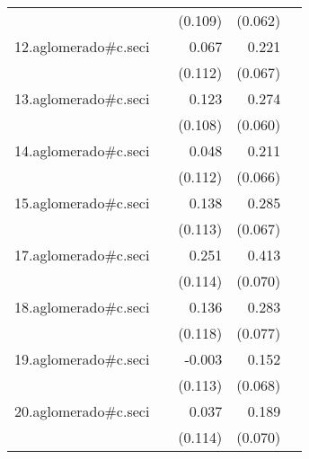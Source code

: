 {\begin{longtable}{l*{4}{D{.}{.}{-1}}}
            &                     &     (0.109)         &     (0.062)         &                     \\
\addlinespace
12.aglomerado#c.seci&                     &       0.067         &       0.221\sym{***}&                     \\
            &                     &     (0.112)         &     (0.067)         &                     \\
\addlinespace
13.aglomerado#c.seci&                     &       0.123         &       0.274\sym{***}&                     \\
            &                     &     (0.108)         &     (0.060)         &                     \\
\addlinespace
14.aglomerado#c.seci&                     &       0.048         &       0.211\sym{**} &                     \\
            &                     &     (0.112)         &     (0.066)         &                     \\
\addlinespace
15.aglomerado#c.seci&                     &       0.138         &       0.285\sym{***}&                     \\
            &                     &     (0.113)         &     (0.067)         &                     \\
\addlinespace
17.aglomerado#c.seci&                     &       0.251\sym{*}  &       0.413\sym{***}&                     \\
            &                     &     (0.114)         &     (0.070)         &                     \\
\addlinespace
18.aglomerado#c.seci&                     &       0.136         &       0.283\sym{***}&                     \\
            &                     &     (0.118)         &     (0.077)         &                     \\
\addlinespace
19.aglomerado#c.seci&                     &      -0.003         &       0.152\sym{*}  &                     \\
            &                     &     (0.113)         &     (0.068)         &                     \\
\addlinespace
20.aglomerado#c.seci&                     &       0.037         &       0.189\sym{**} &                     \\
            &                     &     (0.114)         &     (0.070)         &                     \\

\end{longtable}}
